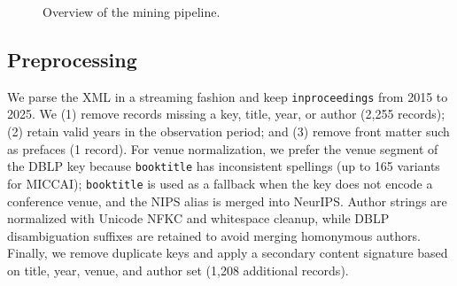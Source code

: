 \documentclass[conference]{IEEEtran}
\begin{document}
\begin{figure}[t]
\centering
{}
\caption{Overview of the mining pipeline.}
\label{fig:pipeline}
\end{figure}

\subsection{Preprocessing}
We parse the XML in a streaming fashion and keep \texttt{inproceedings} from 2015 to 2025. We (1) remove records missing a key, title, year, or author (2,255 records); (2) retain valid years in the observation period; and (3) remove front matter such as prefaces (1 record). For venue normalization, we prefer the venue segment of the DBLP key because \texttt{booktitle} has inconsistent spellings (up to 165 variants for MICCAI); \texttt{booktitle} is used as a fallback when the key does not encode a conference venue, and the NIPS alias is merged into NeurIPS. Author strings are normalized with Unicode NFKC and whitespace cleanup, while DBLP disambiguation suffixes are retained to avoid merging homonymous authors. Finally, we remove duplicate keys and apply a secondary content signature based on title, year, venue, and author set (1,208 additional records).
\end{document}

